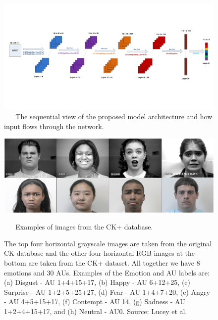 \documentclass[master]{thesis-uestc}
\begin{document}

\begin{figure}[ht]
\includegraphics[width=6in]{pic/sequence_model_architecture.pdf}
\caption{\,\,\,\,\,\,\,\,\,\,The sequential view of the proposed model architecture and how input flows through the network.}
\label{sequence_model_arch}
\end{figure}

\begin{figure}[ht]
\includegraphics[width=5in]{pic/ck+.PNG}
\caption{\,\,\,\,\,\,\,\,\,\,Examples of images from the CK+ database.}
\caption*{The top four horizontal grayscale images are taken from the original CK database and the other four horizontal RGB images at the bottom are taken from the CK+ dataset. All together we have 8 emotions and 30 AUs. Examples of the Emotion and AU labels
are: (a) Disgust - AU 1+4+15+17, (b) Happy - AU 6+12+25, (c) Surprise - AU 1+2+5+25+27, (d) Fear - AU 1+4+7+20, (e) Angry - AU 4+5+15+17, (f) Contempt - AU 14, (g) Sadness - AU 1+2+4+15+17, and (h) Neutral - AU0. Source: Lucey et al.\cite{5543262}}
\label{CK+_images}
\end{figure}
\end{document}
